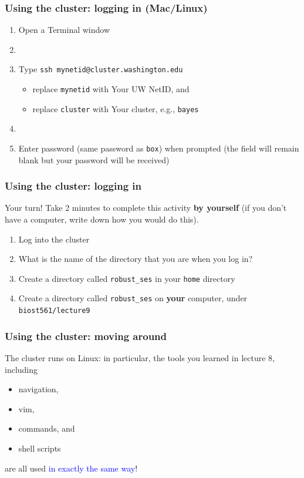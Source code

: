 \documentclass[12pt, 
hyperref={colorlinks=true, linkcolor=BlueViolet, urlcolor=BlueViolet},dvipsnames]{beamer}
\begin{document}
\begin{frame}
\frametitle{Using the cluster: logging in (Mac/Linux)}
\begin{enumerate}
\item Open a Terminal window
\item[]
\item Type \texttt{ssh mynetid@cluster.washington.edu}
\begin{itemize}
\item replace \texttt{mynetid} with Your UW NetID, and 
\item replace \texttt{cluster} with Your cluster, e.g., \texttt{bayes}
\end{itemize} 
\item[]
\item Enter password (same password as \texttt{box}) when prompted (the field will remain blank but your password will be received)
\end{enumerate}

\end{frame}

\begin{frame}
\frametitle{Using the cluster: logging in}
Your turn! Take 2 minutes to complete this activity \textbf{by yourself} (if you don't have a computer, write down how you would do this).
\begin{enumerate}
\item Log into the cluster
\item What is the name of the directory that you are when you log in?
\item Create a directory called \texttt{robust\_ses} in your \texttt{home} directory
\item Create a directory called \texttt{robust\_ses} on \textbf{your} computer, under \texttt{biost561/lecture9}
\end{enumerate}
\end{frame}

\begin{frame}
\frametitle{Using the cluster: moving around}
The cluster runs on Linux: in particular, the tools you learned in lecture 8, including \vspace{-0.3cm} \pause
\begin{itemize}
\item navigation, \pause
\item vim, \pause
\item commands, \pause and
\item shell scripts
\end{itemize}
are all used \textcolor{blue}{in exactly the same way}!
\end{frame}
\end{document}
